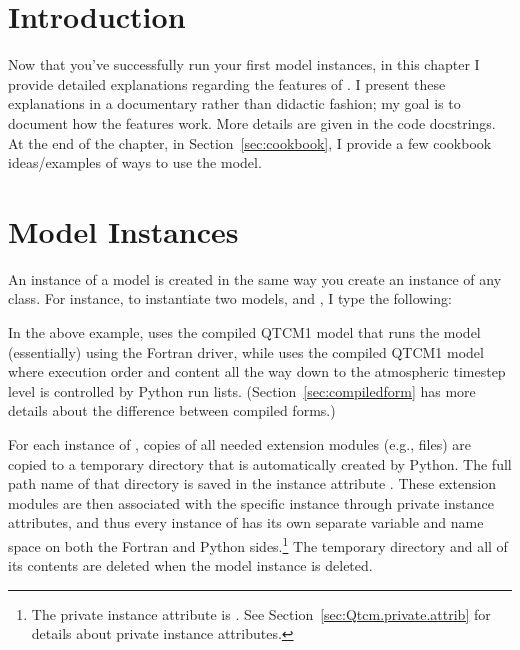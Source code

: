 %


%
\section{Introduction}

Now that you've successfully run your first model instances, in
this chapter I provide detailed explanations regarding the features
of .  I present these explanations in a documentary
rather than didactic fashion; my goal is to document how the features
work.  More details are given in the code docstrings.  At the end
of the chapter, in Section~\ref{sec:cookbook}, I provide a few
cookbook ideas/examples of ways to use the model.




\section{Model Instances}  \label{sec:model.instances}

An instance of a  model is created in  the same way
you create an instance of any class.
For instance, to instantiate two 
models,  and , I type the following:

\begin{codeblock}
\end{codeblock}

In the above example,  uses the compiled QTCM1 model
that runs the model (essentially) using the Fortran driver,
while  uses the compiled QTCM1 model where execution
order and content all the way down to the atmospheric timestep level
is controlled by Python run lists.  (Section~\ref{sec:compiledform}
has more details about the difference between compiled forms.)

For each instance of , copies of all needed extension
modules (e.g.,  files) are copied to a temporary directory
that is automatically created by Python.  The full path name of
that directory is saved in the instance attribute .
These extension modules are then associated with the specific instance 
through private instance attributes,
and thus every instance of  has its own separate variable
and name space on both the Fortran and Python sides.\footnote%
	{The private instance attribute is .
	See Section~\ref{sec:Qtcm.private.attrib} for details about 
	private  instance attributes.}
The temporary directory and all of its contents are deleted when the 
model instance is deleted.

